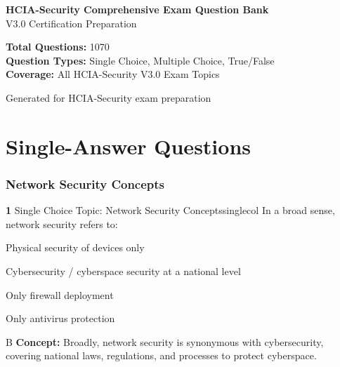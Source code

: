 \documentclass[10pt,a4paper]{article}
\begin{document}
\begin{titlepage}
\centering
\vspace*{2cm}
{\Huge\bfseries\color{hblue} HCIA-Security Comprehensive Exam Question Bank\\[0.8cm]}
{\Large\color{darkslate} V3.0 Certification Preparation\\[0.4cm]}
\vspace{1.5cm}
\begin{tcolorbox}[colback=qbg,colframe=hblue,arc=3mm,boxrule=1pt,width=0.85\textwidth]
\centering
\textbf{Total Questions:} 1070\\[0.3cm]
\textbf{Question Types:} Single Choice, Multiple Choice, True/False\\[0.3cm]
\textbf{Coverage:} All HCIA-Security V3.0 Exam Topics
\end{tcolorbox}
\vfill
{\small Generated for HCIA-Security exam preparation}
\end{titlepage}

\tableofcontents
\newpage

\part{Single-Answer Questions}
\section{Network Security Concepts}
\begin{qcard}{\color{white}\textbf{1} \hfill \small Single Choice \textbar{} Topic: Network Security Concepts}{singlecol}
In a broad sense, network security refers to:

\begin{qoptions}
\item Physical security of devices only
\item Cybersecurity / cyberspace security at a national level
\item Only firewall deployment
\item Only antivirus protection
\end{qoptions}
\begin{explainbox}{B}
\textbf{Concept:} Broadly, network security is synonymous with cybersecurity, covering national laws, regulations, and processes to protect cyberspace.
\end{explainbox}
\end{qcard}
\end{document}
